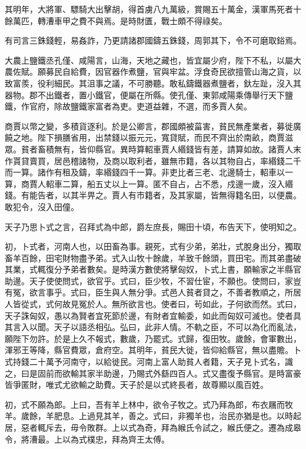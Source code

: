 其明年，大將軍、驃騎大出擊胡，得首虜八九萬級，賞賜五十萬金，漢軍馬死者十餘萬匹，轉漕車甲之費不與焉。是時財匱，戰士頗不得祿矣。

有司言三銖錢輕，易姦詐，乃更請諸郡國鑄五銖錢，周郭其下，令不可磨取鋊焉。

大農上鹽鐵丞孔僅、咸陽言，山海，天地之藏也，皆宜屬少府，陛下不私，以屬大農佐賦。願募民自給費，因官器作煮鹽，官與牢盆。浮食奇民欲擅管山海之貨，以致富羨，役利細民。其沮事之議，不可勝聽。敢私鑄鐵器煮鹽者，釱左趾，沒入其器物。郡不出鐵者，置小鐵官，便屬在所縣。使孔僅、東郭咸陽乘傳舉行天下鹽鐵，作官府，除故鹽鐵家富者為吏。吏道益雜，不選，而多賈人矣。

商賈以幣之變，多積貨逐利。於是公卿言，郡國頗被菑害，貧民無產業者，募徙廣饒之地。陛下損膳省用，出禁錢以振元元，寬貸賦，而民不齊出於南畝，商賈滋眾。貧者畜積無有，皆仰縣官。異時算軺車賈人緡錢皆有差，請算如故。諸賈人末作貰貸賣買，居邑稽諸物，及商以取利者，雖無市籍，各以其物自占，率緡錢二千而一算。諸作有租及鑄，率緡錢四千一算。非吏比者三老、北邊騎士，軺車以一算，商賈人軺車二算，船五丈以上一算。匿不自占，占不悉，戍邊一歲，沒入緡錢。有能告者，以其半畀之。賈人有市籍者，及其家屬，皆無得籍名田，以便農。敢犯令，沒入田僮。

天子乃思卜式之言，召拜式為中郎，爵左庶長，賜田十頃，布告天下，使明知之。

初，卜式者，河南人也，以田畜為事。親死，式有少弟，弟壯，式脫身出分，獨取畜羊百餘，田宅財物盡予弟。式入山牧十餘歲，羊致千餘頭，買田宅。而其弟盡破其業，式輒復分予弟者數矣。是時漢方數使將擊匈奴，卜式上書，願輸家之半縣官助邊。天子使使問式，欲官乎。式曰，臣少牧，不習仕宦，不願也。使問曰，家豈有冤，欲言事乎。式曰，臣生與人無分爭。式邑人貧者貸之，不善者教順之，所居人皆從式，式何故見冤於人。無所欲言也。使者曰，茍如此，子何欲而然。式曰，天子誅匈奴，愚以為賢者宜死節於邊，有財者宜輸委，如此而匈奴可滅也。使者具其言入以聞。天子以語丞相弘。弘曰，此非人情。不軌之臣，不可以為化而亂法，願陛下勿許。於是上久不報式，數歲，乃罷式。式歸，復田牧。歲餘，會軍數出，渾邪王等降，縣官費眾，倉府空。其明年，貧民大徙，皆仰給縣官，無以盡贍。卜式持錢二十萬予河南守，以給徙民。河南上富人助貧人者籍，天子見卜式名，識之，曰是固前而欲輸其家半助邊，乃賜式外繇四百人。式又盡復予縣官。是時富豪皆爭匿財，唯式尤欲輸之助費。天子於是以式終長者，故尊顯以風百姓。

初，式不願為郎。上曰，吾有羊上林中，欲令子牧之。式乃拜為郎，布衣屩而牧羊。歲餘，羊肥息。上過見其羊，善之。式曰，非獨羊也，治民亦猶是也。以時起居，惡者輒斥去，毋令敗群。上以式為奇，拜為緱氏令試之，緱氏便之。遷為成皋令，將漕最。上以為式樸忠，拜為齊王太傅。

